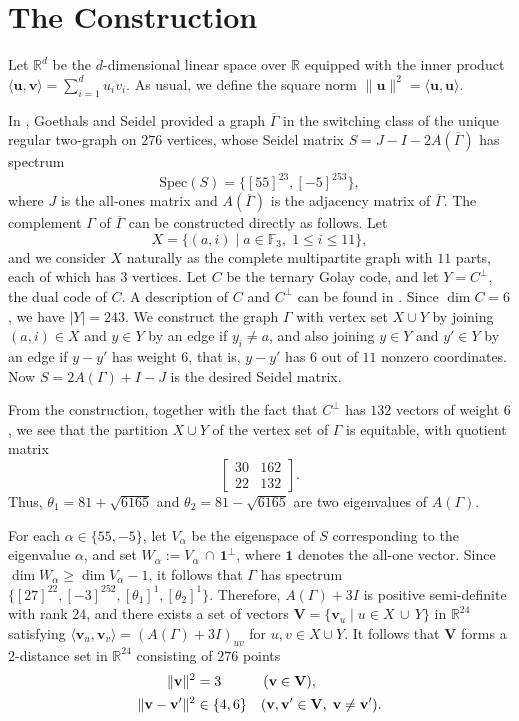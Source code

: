\documentclass[12pt]{article}
\theoremstyle{definition}
\newcommand{\R}{\mathbb{R}}
\newcommand{\bv}{\mathbf{v}}
\newcommand{\bu}{\mathbf{u}}
\begin{document}
\section{The Construction}
Let $\R^d$ be the $d$-dimensional linear space over $\R$ equipped with the inner product $\langle \bu,\bv\rangle=
\sum_{i=1}^{d}u_iv_i$. As usual, we define the square norm 
$\|\bu\|^2=\langle \bu,\bu\rangle$.

In \cite[Theorem 3.4]{MR384597}, Goethals and Seidel provided a graph $\overline{\Gamma}$ in the switching class of the unique regular two-graph on $276$ vertices, whose Seidel matrix $S=J-I-2A(\overline{\Gamma})$ has spectrum $$\mathrm{Spec}(S)=\{[55]^{23},[-5]^{253}\},$$
where $J$ is the all-ones matrix and $A(\overline{\Gamma})$ is the
adjacency matrix of $\overline{\Gamma}$.
The complement $\Gamma$ of $\overline{\Gamma}$ can be constructed directly
as follows.
Let 
\[X=\{(a,i)\mid a\in \mathbb{F}_3,\;1\leq i\leq 11\},\]
and we consider $X$ naturally as the complete multipartite graph
with $11$ parts, each of which has $3$ vertices.
Let $C$ be the ternary Golay code, and let
$Y=C^\perp$, the dual code of $C$. 
A description of $C$ and $C^\perp$ can be found in
\cite[Lemma 4.3 and Remark 4.4]{MR384597}.
Since $\dim C=6$, we have $|Y|=243$.
We construct the graph $\Gamma$ with vertex set $X\cup Y$ by joining
$(a,i)\in X$ and $y\in Y$ by an edge if $y_i\neq a$, and also joining
$y\in Y$ and $y'\in Y$ by an edge if $y-y'$ has weight $6$, that is,
$y-y'$ has $6$ out of $11$ nonzero coordinates.
Now $S=2A(\Gamma)+I-J$ is the desired Seidel matrix.

From the construction, together with the fact that $C^\perp$
has $132$ vectors of weight $6$, we see that
the partition $X\cup Y$ of the vertex set of $\Gamma$ is equitable, 
with quotient matrix
$$
	\begin{bmatrix}
		30&162\\
		22&132
	\end{bmatrix}.
$$
Thus, $\theta_1=81+\sqrt{6165}$ and $\theta_2=81-\sqrt{6165}$
are two eigenvalues of $A(\Gamma)$.

For each $\alpha\in\{55,-5\}$,
let $V_\alpha$ be the eigenspace of $S$ corresponding to the eigenvalue $\alpha$, and set $W_\alpha:=V_\alpha\,\cap\,\mathbf{1}^{\bot}$, where $\mathbf{1}$ denotes the all-one vector.
Since $\dim W_\alpha\ge \dim V_\alpha-1$, it follows that $\Gamma$ has spectrum $\{[27]^{22},[-3]^{252},[\theta_1]^1,[\theta_2]^1\}$.
Therefore, $A(\Gamma)+3I$ is positive semi-definite with rank $24$, and there exists a set of vectors $\mathbf{V}=\{\mathbf{v}_u\mid u\in X\,\cup\, Y\}$ in $\R^{24}$ satisfying
$\langle \mathbf{v}_u,\mathbf{v}_v\rangle=(A(\Gamma)+3I)_{uv}$
for $u, v\in X\cup Y$. It follows that $\mathbf{V}$
forms a $2$-distance set in $\R^{24}$ consisting of $276$ points
\begin{align}
\|\bv\|^2&=3\quad\quad\ \ \ (\bv\in \mathbf{V}),\notag\\
\|\bv-\bv'\|^2&\in\{4,6\}\quad(\bv,\bv'\in \mathbf{V},\;
\bv\neq\bv').\label{xy}
\end{align}
\end{document}
